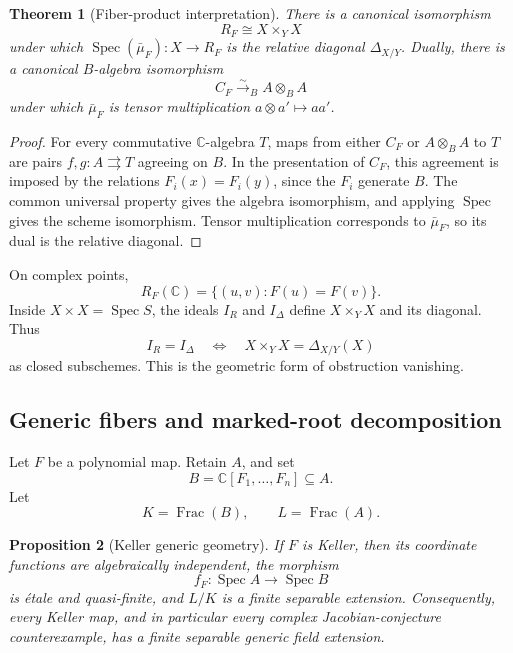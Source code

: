 \documentclass[11pt]{article}
\newtheorem{theorem}{Theorem}[section]
\newtheorem{proposition}[theorem]{Proposition}
\theoremstyle{remark}
\DeclareMathOperator{\Spec}{Spec}
\DeclareMathOperator{\Frac}{Frac}
\newcommand{\C}{\mathbb C}
\begin{document}
\begin{theorem}[Fiber-product interpretation]
\label{thm:collision-tensor-product}
There is a canonical isomorphism
\[
  R_F\cong X\times_YX
\]
under which \(\Spec(\bar\mu_F)\colon X\to R_F\) is the relative diagonal
\(\Delta_{X/Y}\).  Dually, there is a canonical \(B\)-algebra isomorphism
\[
  C_F\xrightarrow{\sim}_B A\otimes_BA
\]
under which \(\bar\mu_F\) is tensor multiplication
\(a\otimes a'\mapsto aa'\).
\end{theorem}

\begin{proof}
For every commutative \(\C\)-algebra \(T\), maps from either \(C_F\) or
\(A\otimes_BA\) to \(T\) are pairs
\(f,g\colon A\rightrightarrows T\) agreeing on \(B\).  In the presentation
of \(C_F\), this agreement is imposed by the relations
\(F_i(x)=F_i(y)\), since the \(F_i\) generate \(B\).  The common universal
property gives the algebra isomorphism, and applying \(\Spec\) gives the
scheme isomorphism.  Tensor multiplication corresponds to
\(\bar\mu_F\), so its dual is the relative diagonal.
\end{proof}

On complex points,
\[
  R_F(\C)=\{(u,v):F(u)=F(v)\}.
\]
Inside \(X\times X=\Spec S\), the ideals \(I_R\) and \(I_\Delta\)
define \(X\times_YX\) and its diagonal.  Thus
\[
  I_R=I_\Delta
  \quad\Longleftrightarrow\quad
  X\times_YX=\Delta_{X/Y}(X)
\]
as closed subschemes.  This is the geometric form of obstruction
vanishing.

\subsection{Generic fibers and marked-root decomposition}
\label{sec:generic-galois-bridge}

Let \(F\) be a polynomial map.  Retain \(A\), and set
\[
  B=\C[F_1,\dots,F_n]\subseteq A.
\]
Let
\[
  K=\Frac(B),
  \qquad
  L=\Frac(A).
\]

\begin{proposition}[Keller generic geometry]
\label{prop:keller-generic-geometry}
If \(F\) is Keller, then its coordinate functions are algebraically
independent, the morphism
\[
  f_F\colon\Spec A\longrightarrow\Spec B
\]
is \'etale and quasi-finite, and \(L/K\) is a finite separable extension.
Consequently, every Keller map, and in particular every complex
Jacobian-conjecture counterexample, has a finite separable generic field
extension.
\end{proposition}
\end{document}
